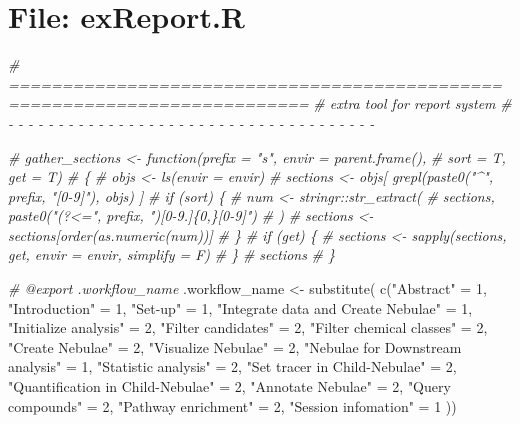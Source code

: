 \documentclass[
]{article}
\newenvironment{Shaded}{\begin{snugshade}}{\end{snugshade}}
\newcommand{\CommentTok}[1]{\textcolor[rgb]{0.56,0.35,0.01}{\textit{#1}}}
\newcommand{\DecValTok}[1]{\textcolor[rgb]{0.00,0.00,0.81}{#1}}
\newcommand{\FunctionTok}[1]{\textcolor[rgb]{0.00,0.00,0.00}{#1}}
\newcommand{\NormalTok}[1]{#1}
\newcommand{\OtherTok}[1]{\textcolor[rgb]{0.56,0.35,0.01}{#1}}
\newcommand{\StringTok}[1]{\textcolor[rgb]{0.31,0.60,0.02}{#1}}
\begin{document}
\hypertarget{file-exreport.r}{%
\section{File: exReport.R}\label{file-exreport.r}}

\begin{Shaded}
\begin{Highlighting}[]
\CommentTok{\# ==========================================================================}
\CommentTok{\# extra tool for report system}
\CommentTok{\# {-} {-} {-} {-} {-} {-} {-} {-} {-} {-} {-} {-} {-} {-} {-} {-} {-} {-} {-} {-} {-} {-} {-} {-} {-} {-} {-} {-} {-} {-} {-} {-} {-} {-} {-} {-} {-}}

\CommentTok{\# gather\_sections \textless{}{-} function(prefix = "s", envir = parent.frame(),}
\CommentTok{\#   sort = T, get = T)}
\CommentTok{\# \{}
\CommentTok{\#   objs \textless{}{-} ls(envir = envir)}
\CommentTok{\#   sections \textless{}{-} objs[ grepl(paste0("\^{}", prefix, "[0{-}9]"), objs) ]}
\CommentTok{\#   if (sort) \{}
\CommentTok{\#     num \textless{}{-} stringr::str\_extract(}
\CommentTok{\#       sections, paste0("(?\textless{}=", prefix, ")[0{-}9.]\{0,\}[0{-}9]")}
\CommentTok{\#     )}
\CommentTok{\#     sections \textless{}{-} sections[order(as.numeric(num))]}
\CommentTok{\#   \}}
\CommentTok{\#   if (get) \{}
\CommentTok{\#     sections \textless{}{-} sapply(sections, get, envir = envir, simplify = F)}
\CommentTok{\#   \}}
\CommentTok{\#   sections}
\CommentTok{\# \}}

\CommentTok{\#\textquotesingle{} @export .workflow\_name}
\NormalTok{.workflow\_name }\OtherTok{\textless{}{-}}
  \FunctionTok{substitute}\NormalTok{(}
    \FunctionTok{c}\NormalTok{(}\StringTok{"Abstract"} \OtherTok{=} \DecValTok{1}\NormalTok{, }\StringTok{"Introduction"} \OtherTok{=} \DecValTok{1}\NormalTok{, }\StringTok{"Set{-}up"} \OtherTok{=} \DecValTok{1}\NormalTok{,}
      \StringTok{"Integrate data and Create Nebulae"} \OtherTok{=} \DecValTok{1}\NormalTok{,}
      \StringTok{"Initialize analysis"} \OtherTok{=} \DecValTok{2}\NormalTok{,}
      \StringTok{"Filter candidates"} \OtherTok{=} \DecValTok{2}\NormalTok{,}
      \StringTok{"Filter chemical classes"} \OtherTok{=} \DecValTok{2}\NormalTok{,}
      \StringTok{"Create Nebulae"} \OtherTok{=} \DecValTok{2}\NormalTok{,}
      \StringTok{"Visualize Nebulae"} \OtherTok{=} \DecValTok{2}\NormalTok{,}
      \StringTok{"Nebulae for Downstream analysis"} \OtherTok{=} \DecValTok{1}\NormalTok{,}
      \StringTok{"Statistic analysis"} \OtherTok{=} \DecValTok{2}\NormalTok{,}
      \StringTok{"Set tracer in Child{-}Nebulae"} \OtherTok{=} \DecValTok{2}\NormalTok{,}
      \StringTok{"Quantification in Child{-}Nebulae"} \OtherTok{=} \DecValTok{2}\NormalTok{,}
      \StringTok{"Annotate Nebulae"} \OtherTok{=} \DecValTok{2}\NormalTok{,}
      \StringTok{"Query compounds"} \OtherTok{=} \DecValTok{2}\NormalTok{,}
      \StringTok{"Pathway enrichment"} \OtherTok{=} \DecValTok{2}\NormalTok{,}
      \StringTok{"Session infomation"} \OtherTok{=} \DecValTok{1}
\NormalTok{      ))}
\end{Highlighting}
\end{Shaded}
\end{document}
